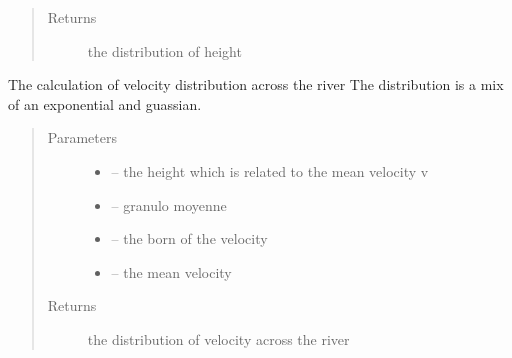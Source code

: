 \documentclass[letterpaper,10pt,english]{sphinxmanual}
\begin{document}
\begin{fulllineitems}
\begin{fulllineitems}
\begin{quote}
\begin{description}
\begin{itemize}
\end{itemize}

\item[{Returns}] \leavevmode
the distribution of height

\end{description}\end{quote}

\end{fulllineitems}


\begin{fulllineitems}
\label{\detokenize{index:src.stathab_c.Stathab.dist_v}}
The calculation of velocity distribution across the river
The distribution is a mix of an exponential and guassian.
\begin{quote}\begin{description}
\item[{Parameters}] \leavevmode\begin{itemize}
\item {} 
 -- the height which is related to the mean velocity v

\item {} 
 -- granulo moyenne

\item {} 
 -- the born of the velocity

\item {} 
 -- the mean velocity

\end{itemize}

\item[{Returns}] \leavevmode
the distribution of velocity across the river

\end{description}\end{quote}

\end{fulllineitems}



\end{fulllineitems}
\end{document}
